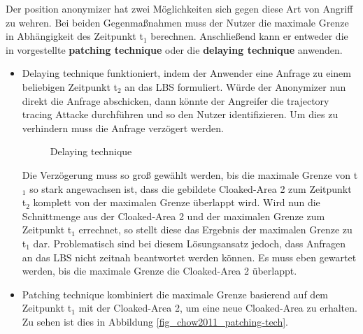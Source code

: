 Der position anonymizer hat zwei Möglichkeiten sich gegen diese Art von Angriff zu wehren. Bei beiden Gegenmaßnahmen muss der Nutzer die maximale Grenze in Abhängigkeit des Zeitpunkt t$_{1}$ berechnen. Anschließend kann er entweder die in \cite{Chow2011} vorgestellte \textbf{patching technique} oder die \textbf{delaying technique} anwenden. 
\begin{itemize} 
\item{Delaying technique} funktioniert, indem der Anwender eine Anfrage zu einem beliebigen Zeitpunkt t$_{2}$ an das LBS formuliert. Würde der Anonymizer nun direkt die Anfrage abschicken, dann könnte der Angreifer die trajectory tracing Attacke durchführen und so den Nutzer identifizieren. Um dies zu verhindern muss die Anfrage verzögert werden. 
\begin{figure}[!h]
		\centering
		\caption{Delaying technique}
		\label{fig_chow2011_delaying-tech}
\end{figure}
Die Verzögerung muss so groß gewählt werden, bis die maximale Grenze von t$_{1}$ so stark angewachsen ist, dass die gebildete Cloaked-Area 2 zum Zeitpunkt t$_{2}$ komplett von der maximalen Grenze überlappt wird. Wird nun die Schnittmenge aus der Cloaked-Area 2 und der maximalen Grenze zum Zeitpunkt t$_{1}$ errechnet, so stellt diese das Ergebnis der maximalen Grenze zu t$_{1}$ dar. Problematisch sind bei diesem Lösungsansatz jedoch, dass Anfragen an das LBS nicht zeitnah beantwortet werden können. Es muss eben gewartet werden, bis die maximale Grenze die Cloaked-Area 2 überlappt. 
\item{Patching technique} kombiniert die maximale Grenze basierend auf dem Zeitpunkt t$_{1}$ mit der Cloaked-Area 2, um eine neue Cloaked-Area zu erhalten. Zu sehen ist dies in Abbildung \ref{fig_chow2011_patching-tech}.
\begin{figure}[!h]
		\centering

\end{figure}
\end{itemize}

